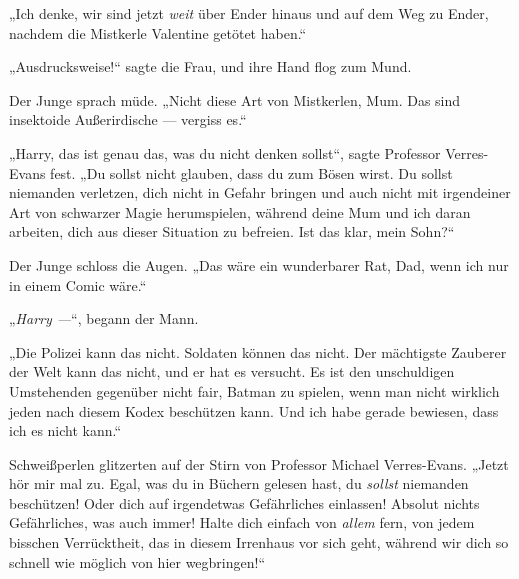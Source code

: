 „Ich denke, wir sind jetzt \emph{weit} über Ender hinaus und auf dem Weg zu Ender, nachdem die Mistkerle Valentine getötet haben.“

„Ausdrucksweise!“ sagte die Frau, und ihre Hand flog zum Mund.

Der Junge sprach müde.
„Nicht diese Art von Mistkerlen, Mum. Das sind insektoide Außerirdische — vergiss es.“

„Harry, das ist genau das, was du nicht denken sollst“, sagte Professor Verres-Evans fest.
„Du sollst nicht glauben, dass du zum Bösen wirst. Du sollst niemanden verletzen, dich nicht in Gefahr bringen und auch nicht mit irgendeiner Art von schwarzer Magie herumspielen, während deine Mum und ich daran arbeiten, dich aus dieser Situation zu befreien. Ist das klar, mein Sohn?“

Der Junge schloss die Augen.
„Das wäre ein wunderbarer Rat, Dad, wenn ich nur in einem Comic wäre.“

„\emph{Harry —}“, begann der Mann.

„Die Polizei kann das nicht. Soldaten können das nicht. Der mächtigste Zauberer der Welt kann das nicht, und er hat es versucht. Es ist den unschuldigen Umstehenden gegenüber nicht fair, Batman zu spielen, wenn man nicht wirklich jeden nach diesem Kodex beschützen kann. Und ich habe gerade bewiesen, dass ich es nicht kann.“

Schweißperlen glitzerten auf der Stirn von Professor Michael Verres-Evans.
„Jetzt hör mir mal zu. Egal, was du in Büchern gelesen hast, du \emph{sollst} niemanden beschützen! Oder dich auf irgendetwas Gefährliches einlassen! Absolut nichts Gefährliches, was auch immer! Halte dich einfach von \emph{allem} fern, von jedem bisschen Verrücktheit, das in diesem Irrenhaus vor sich geht, während wir dich so schnell wie möglich von hier wegbringen!“

